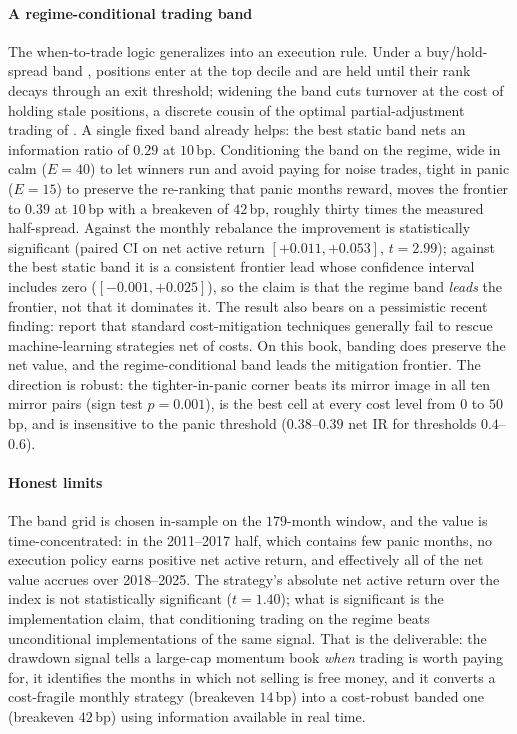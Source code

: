 

\paragraph{A regime-conditional trading band}
The when-to-trade logic generalizes into an execution rule. Under a buy/hold-spread band \citep{NovyMarxVelikov2016, NovyMarxVelikov2019}, positions enter at the top decile and are held until their rank decays through an exit threshold; widening the band cuts turnover at the cost of holding stale positions, a discrete cousin of the optimal partial-adjustment trading of \citet{GarleanuPedersen2013}. A single fixed band already helps: the best static band nets an information ratio of $0.29$ at $10$\,bp. Conditioning the band on the regime, wide in calm ($E=40$) to let winners run and avoid paying for noise trades, tight in panic ($E=15$) to preserve the re-ranking that panic months reward, moves the frontier to $0.39$ at $10$\,bp with a breakeven of $42$\,bp, roughly thirty times the measured half-spread. Against the monthly rebalance the improvement is statistically significant (paired CI on net active return $[+0.011, +0.053]$, $t = 2.99$); against the best static band it is a consistent frontier lead whose confidence interval includes zero ($[-0.001, +0.025]$), so the claim is that the regime band \emph{leads} the frontier, not that it dominates it. The result also bears on a pessimistic recent finding: \citet{AzevedoHoegnerVelikov2024} report that standard cost-mitigation techniques generally fail to rescue machine-learning strategies net of costs. On this book, banding does preserve the net value, and the regime-conditional band leads the mitigation frontier. The direction is robust: the tighter-in-panic corner beats its mirror image in all ten mirror pairs (sign test $p = 0.001$), is the best cell at every cost level from $0$ to $50$\,bp, and is insensitive to the panic threshold ($0.38$--$0.39$ net IR for thresholds $0.4$--$0.6$).

\paragraph{Honest limits}
The band grid is chosen in-sample on the $179$-month window, and the value is time-concentrated: in the 2011--2017 half, which contains few panic months, no execution policy earns positive net active return, and effectively all of the net value accrues over 2018--2025. The strategy's absolute net active return over the index is not statistically significant ($t = 1.40$); what is significant is the implementation claim, that conditioning trading on the regime beats unconditional implementations of the same signal. That is the deliverable: the drawdown signal tells a large-cap momentum book \emph{when} trading is worth paying for, it identifies the months in which not selling is free money, and it converts a cost-fragile monthly strategy (breakeven $14$\,bp) into a cost-robust banded one (breakeven $42$\,bp) using information available in real time.
